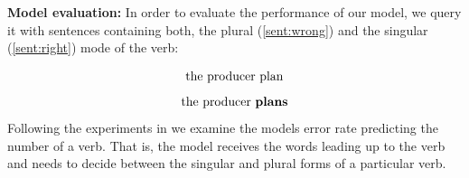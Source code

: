 \documentclass[11pt,a4paper]{article}
\begin{document}
\textbf{Model evaluation:} In order to evaluate the performance of our model, we query it with sentences containing both, the plural (\ref{sent:wrong}) and the singular (\ref{sent:right}) mode of the verb: 

\begin{equation}
	\label{sent:wrong}
	\textnormal{the producer plan}
\end{equation}
\begin{equation}
	\label{sent:right}
	\textnormal{the producer  \textbf{plans}}
\end{equation}
Following the experiments in \citep{Linzen2016} we examine the models error rate predicting the number of a verb. That is, the model receives the words leading up to the verb and needs to decide between the singular and plural forms of a particular verb.
\end{document}
